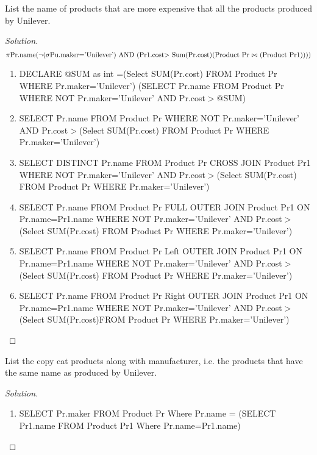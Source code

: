 \documentclass[10pt,a4paper]{article}
\newenvironment{problem}[2][Problem]{\begin{trivlist}
\item[\hskip \labelsep {\bfseries #1}\hskip \labelsep {\bfseries #2.}]}{\end{trivlist}}
\begin{document}
\begin{problem}{3}
List the name of products that are more expensive that all the products produced by Unilever.
\end{problem}

\begin{proof}[Solution]
\begin{equation*}
\pi \text{Pr.name} (\neg( \sigma\text{Pu.maker='Unilever') AND (Pr1.cost$>$ Sum(Pr.cost)(Product Pr $\bowtie$ (\text{Product Pr1}}))))
\end{equation*}

\begin{enumerate}
	\item DECLARE @SUM as int =(Select SUM(Pr.cost) FROM Product Pr WHERE Pr.maker='Unilever') (SELECT Pr.name FROM Product Pr WHERE NOT Pr.maker='Unilever' AND Pr.cost$>$@SUM)
	\item SELECT Pr.name FROM Product Pr WHERE NOT Pr.maker='Unilever' AND Pr.cost$>$(Select SUM(Pr.cost) FROM Product Pr WHERE Pr.maker='Unilever')
	\item SELECT DISTINCT Pr.name FROM Product Pr CROSS JOIN Product Pr1 WHERE NOT Pr.maker='Unilever' AND Pr.cost$>$(Select SUM(Pr.cost) FROM Product Pr WHERE Pr.maker='Unilever')
	\item SELECT  Pr.name FROM Product Pr FULL OUTER JOIN Product Pr1 ON Pr.name=Pr1.name WHERE NOT Pr.maker='Unilever' AND Pr.cost$>$(Select SUM(Pr.cost) FROM Product Pr WHERE Pr.maker='Unilever')
	\item SELECT  Pr.name FROM Product Pr Left OUTER JOIN Product Pr1 ON Pr.name=Pr1.name WHERE NOT Pr.maker='Unilever' AND Pr.cost$>$(Select SUM(Pr.cost) FROM Product Pr WHERE Pr.maker='Unilever')
	\item SELECT  Pr.name FROM Product Pr Right OUTER JOIN Product Pr1
ON Pr.name=Pr1.name WHERE NOT Pr.maker='Unilever' AND Pr.cost$>$(Select SUM(Pr.cost)FROM Product Pr WHERE Pr.maker='Unilever')
\end{enumerate}
\end{proof}

\begin{problem}{4}
List the copy cat products along with manufacturer, i.e. the products that have the same name as produced by Unilever.
\end{problem}

\begin{proof}[Solution]
\begin{enumerate}
	\item SELECT Pr.maker FROM Product Pr Where Pr.name = (SELECT Pr1.name
	FROM Product Pr1 Where Pr.name=Pr1.name)
\end{enumerate}
\end{proof}
\end{document}
